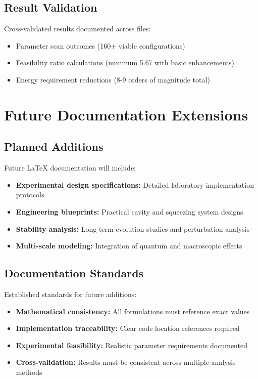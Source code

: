 \documentclass[11pt]{article}
\begin{document}
\subsection{Result Validation}
Cross-validated results documented across files:
\begin{itemize}
\item Parameter scan outcomes (160+ viable configurations)
\item Feasibility ratio calculations (minimum 5.67 with basic enhancements)
\item Energy requirement reductions (8-9 orders of magnitude total)
\end{itemize}

\section{Future Documentation Extensions}

\subsection{Planned Additions}
Future LaTeX documentation will include:
\begin{itemize}
\item \textbf{Experimental design specifications:} Detailed laboratory implementation protocols
\item \textbf{Engineering blueprints:} Practical cavity and squeezing system designs
\item \textbf{Stability analysis:} Long-term evolution studies and perturbation analysis
\item \textbf{Multi-scale modeling:} Integration of quantum and macroscopic effects
\end{itemize}

\subsection{Documentation Standards}
Established standards for future additions:
\begin{itemize}
\item \textbf{Mathematical consistency:} All formulations must reference exact values
\item \textbf{Implementation traceability:} Clear code location references required
\item \textbf{Experimental feasibility:} Realistic parameter requirements documented
\item \textbf{Cross-validation:} Results must be consistent across multiple analysis methods
\end{itemize}
\end{document}
